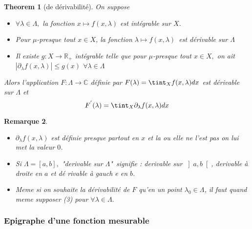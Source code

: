 \documentclass[3pt]{article}
\newtheorem{theorem}{Theorem}
\newtheorem{remark}[theorem]{Remarque}
\begin{document}
\bigskip

\begin{theorem}[de d\'{e}rivabilit\'{e}]
On suppose

\begin{itemize}
\item $\forall \lambda \in \Lambda ,$ la fonction $x\longmapsto f(x,\lambda
) $ est int\'{e}grable sur $X$.

\item Pour $\mu $-presque tout $x\in X$, la fonction $\lambda \longmapsto
f(x,\lambda )$\ est d\'{e}rivable sur $\Lambda $

\item Il existe $g:X\rightarrow \mathbb{R}_{+}$ int\'{e}grable telle que
pour $\mu $-presque tout $x\in X,$ on ait $\left\vert \partial _{\lambda
}f(x,\lambda )\right\vert \leq g(x)$ $\forall \lambda \in \Lambda $
\end{itemize}

Alors l'application $F:\Lambda \rightarrow \mathbb{C}$ d\'{e}finie par $%
F(\lambda )=\tint_{X}f(x,\lambda )dx$ est d\'{e}rivable sur $\Lambda $ et 
\begin{equation*}
F^{^{\prime }}(\lambda )=\tint_{X}\partial _{\lambda }f(x,\lambda )dx
\end{equation*}
\end{theorem}

\bigskip

\begin{remark}
\begin{itemize}
\item $\partial _{\lambda }f(x,\lambda )$ est d\'{e}finie presque partout en 
$x$ et la ou elle ne l'est pas on lui met la valeur $0$.

\item Si $\Lambda =\left[ a,b\right] ,$ "derivable sur $\Lambda $"\ signifie
: derivable sur $\left] a,b\right[ $, derivable \`{a} droite en $a$ et d\'{e}%
rivable \`{a} gauch e en $b$.

\item Meme si on souhaite la d\'{e}rivabilit\'{e} de $F$ qu'en un point $%
\lambda _{0}\in \Lambda $, il faut quand meme supposer (3) pour $\forall
\lambda \in \Lambda .$
\end{itemize}
\end{remark}

\bigskip

\subsubsection{Epigraphe d'une fonction mesurable}
\end{document}
